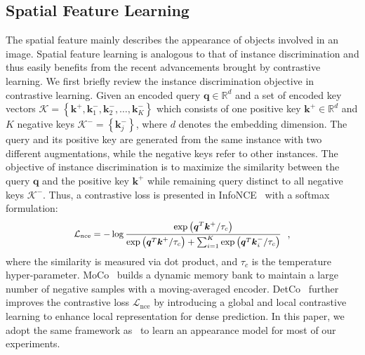 \documentclass{article}
\begin{document}
\subsection{Spatial Feature Learning}
\label{spatial_feature_learning}
The spatial feature mainly describes the appearance of objects involved in an image. Spatial feature learning is analogous to that of instance discrimination and thus easily benefits from the recent advancements brought by contrastive learning. We first briefly review the instance discrimination objective in contrastive learning. Given an encoded query $\boldsymbol{q}\in\mathbb{R}^d$ and a set of encoded key vectors $\mathcal{K}=\left\{\boldsymbol{k}^{+}, \boldsymbol{k}_{1}^{-}, \boldsymbol{k}_{2}^{-}, \ldots, \boldsymbol{k}_{K}^{-}\right\}$ which consists of one positive key $\boldsymbol{k}^{+}\in\mathbb{R}^d$ and $K$ negative keys $\mathcal{K^{-}}=\left\{\boldsymbol{k}_{j}^{-}\right\}$, where $d$ denotes the embedding dimension. The query and its positive key are generated from the same instance with two different augmentations, while the negative keys refer to other instances. The objective of instance discrimination is to maximize the similarity between the query $\boldsymbol{q}$ and the positive key $\boldsymbol{k}^{+}$ while remaining query distinct to all negative keys $\mathcal{K^{-}}$. Thus, a contrastive loss is presented in InfoNCE~\cite{van2018representation}  with a softmax formulation:
	\begin{equation}\label{eq:nce}
		\small
		\begin{aligned}
			\mathcal{L}_{\text{nce}}=-\log \frac{\exp \left(\boldsymbol{q}^{T} \boldsymbol{k}^{+} / \tau_c\right)}{\exp \left(\boldsymbol{q}^{T} \boldsymbol{k}^{+} / \tau_c\right)+\sum_{i=1}^{K} \exp \left(\boldsymbol{q}^{T} \boldsymbol{k}_{i}^{-} / \tau_c\right)}
		\end{aligned}~~,
	\end{equation}
where the similarity is measured via dot product, and $\tau_c$ is the temperature hyper-parameter. MoCo~\cite{he2020momentum} builds a dynamic memory bank to maintain a large number of negative samples with a moving-averaged encoder. DetCo~\cite{xie2021detco} further improves the contrastive loss $\mathcal{L}_{\text{nce}}$ by introducing a global and local contrastive learning to enhance local representation for dense prediction. In this paper, we adopt the same framework as~\cite{he2020momentum}\cite{xie2021detco} to learn an appearance model for most of our experiments.
\end{document}

